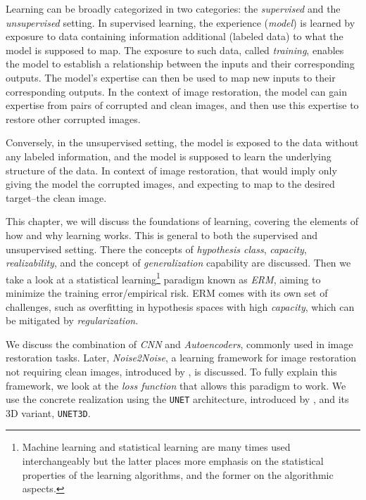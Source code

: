 Learning can be broadly categorized in two categories: the \textit{supervised} and the \textit{unsupervised} setting. In supervised learning, the experience (\textit{model}) is learned by exposure to data containing information additional (labeled data) to what the model is supposed to map. The exposure to such data, called \textit{training}, enables the model to establish a relationship between the inputs and their corresponding outputs. The model’s expertise can then be used to map new inputs to their corresponding outputs. In the context of image restoration, the model can gain expertise from pairs of corrupted and clean images, and then use this expertise to restore other corrupted images.

Conversely, in the unsupervised setting, the model is exposed to the data without any labeled information, and the model is supposed to learn the underlying structure of the data. In context of image restoration, that would imply only giving the model the corrupted images, and expecting to map to the desired target--the clean image.

This chapter, we will discuss the foundations of learning, covering the elements of how and why learning works. This is general to both the supervised and unsupervised setting. There the concepts of \textit{hypothesis class}, \textit{capacity}, \textit{realizability}, and the concept of \textit{generalization} capability are discussed. Then we take a look at a statistical learning\footnote{Machine learning and statistical learning are many times used interchangeably but the latter places more emphasis on the statistical properties of the learning algorithms, and the former on the algorithmic aspects.} paradigm known as \textit{\gls{ERM}}, aiming to minimize the training error/empirical risk. \Gls{ERM} comes with its own set of challenges, such as overfitting in hypothesis spaces with high \textit{capacity}, which can be mitigated by \textit{regularization}. 

We discuss the combination of \textit{\gls{CNN}} and \textit{Autoencoders}, commonly used in image restoration tasks. Later, \textit{Noise2Noise}, a learning framework for image restoration not requiring clean images, introduced by \citeauthor{lehtinenNoise2NoiseLearningImage2018}, is discussed. To fully explain this framework, we look at the \textit{loss function} that allows this paradigm to work. We use the concrete realization using the \texttt{UNET} architecture, introduced by \citeauthor{ronnebergerUNetConvolutionalNetworks}, and its 3D variant, \texttt{UNET3D}.

